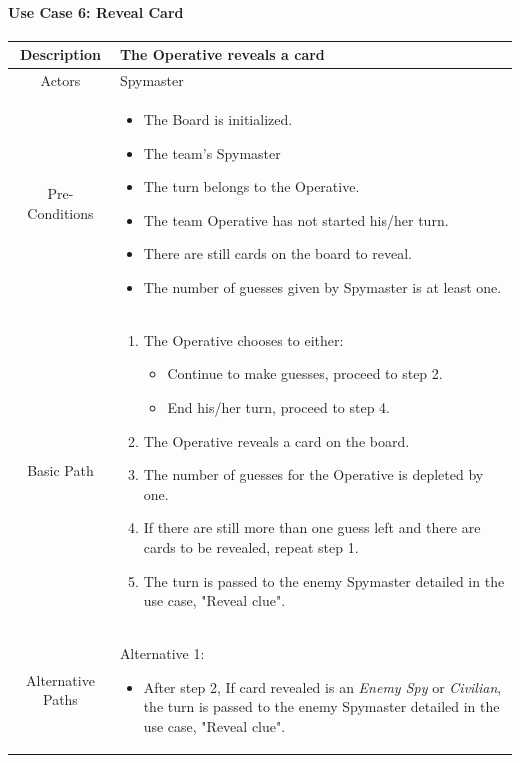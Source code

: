 \documentclass[10pt, a4paper]{article}
\begin{document}
	\newpage
		
	\paragraph{Use Case 6: Reveal Card}
	\begin{center}
		\begin{tabular}{ |c|p{10cm}| } 
			\hline
			Description & The Operative reveals a card \\ 
			\hline
			Actors & Spymaster \\
			\hline 
			Pre-Conditions & \begin{itemize}[noitemsep,topsep=0pt]
				\item The Board is initialized.
				\item The team's Spymaster 
				\item The turn belongs to the Operative.
				\item The team Operative has not started his/her turn.
				\item There are still cards on the board to reveal.
				\item The number of guesses given by Spymaster is at least one.
			\end{itemize} \\
			\hline
			Basic Path & 
			\begin{enumerate}
				\item The Operative chooses to either:
				\begin{itemize}
					\item Continue to make guesses, proceed to step 2.
					\item End his/her turn, proceed to step 4.
				\end{itemize}
				\item The Operative reveals a card on the board.
				\item The number of guesses for the Operative is depleted by one.
				\item If there are still more than one guess left and there are cards to be revealed, repeat step 1.
				\item The turn is passed to the enemy Spymaster detailed in the use case, "Reveal clue". 
			\end{enumerate} \\
			\hline 
			Alternative Paths & 
			Alternative 1:
				\begin{itemize}[noitemsep,topsep=0pt]
					\item After step 2, If card revealed is an \textit{Enemy Spy} or \textit{Civilian}, the turn is passed to the enemy Spymaster detailed in the use case, "Reveal clue".

\end{itemize}
\end{tabular}
\end{center}
\end{document}

